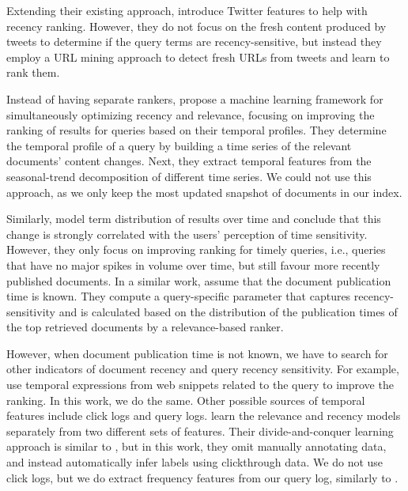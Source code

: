 Extending their existing approach, \citet{dong2010time} introduce Twitter features to help with recency ranking. However, they do not focus on the fresh content produced by tweets to determine if the query terms are recency-sensitive, but instead they employ a URL mining approach to detect fresh URLs from tweets and learn to rank them.

Instead of having separate rankers, \citet{dai2011learning} propose a machine learning framework for simultaneously optimizing recency and relevance, focusing on improving the ranking of results for queries based on their temporal profiles. They determine the temporal profile of a query by building a time series of the relevant documents' content changes. Next, they extract temporal features from the seasonal-trend decomposition of different time series. We could not use this approach, as we only keep the most updated snapshot of documents in our index.

Similarly, \citet{cheng2013fresh} model term distribution of results over time and conclude that this change is strongly correlated with the users' perception of time sensitivity. However, they only focus on improving ranking for timely queries, i.e., queries that have no major spikes in volume over time, but still favour more recently published documents. In a similar work, \citet{efron2011estimation} assume that the document publication time is known. They compute a query-specific parameter that captures recency-sensitivity and is calculated based on the distribution of the publication times of the top retrieved documents by a relevance-based ranker.

However, when document publication time is not known, we have to search for other indicators of document recency and query recency sensitivity. For example, \citet{campos2016gte} use temporal expressions from web snippets related to the query to improve the ranking. In this work, we do the same. Other possible sources of temporal features include click logs and query logs. \citet{wang2012joint} learn the relevance and recency models separately from two different sets of features. Their divide-and-conquer learning approach is similar to \citep{dai2011learning}, but in this work, they omit manually annotating data, and instead automatically infer labels using clickthrough data. We do not use click logs, but we do extract frequency features from our query log, similarly to \citep{metzler2009improving, lefortier2014online}.


